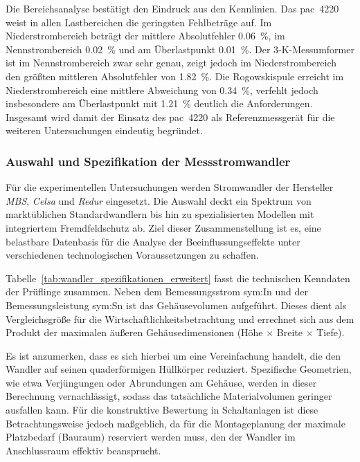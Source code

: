 Die Bereichsanalyse bestätigt den Eindruck aus den Kennlinien. Das \gls{pac}~4220 weist in allen Lastbereichen die geringsten Fehlbeträge auf. Im Niederstrombereich beträgt der mittlere Absolutfehler \SI{0,06}{\percent}, im Nennstrombereich \SI{0,02}{\percent} und am Überlastpunkt \SI{0,01}{\percent}. Der 3-K-Messumformer ist im Nennstrombereich zwar sehr genau, zeigt jedoch im Niederstrombereich den größten mittleren Absolutfehler von \SI{1,82}{\percent}. Die Rogowskispule erreicht im Niederstrombereich eine mittlere Abweichung von \SI{0,34}{\percent}, verfehlt jedoch insbesondere am Überlastpunkt mit \SI{1,21}{\percent} deutlich die Anforderungen. Insgesamt wird damit der Einsatz des \gls{pac}~4220 als Referenzmessgerät für die weiteren Untersuchungen eindeutig begründet.









\subsubsection{Auswahl und Spezifikation der Messstromwandler}
\label{sec:auswahl_wandler}

Für die experimentellen Untersuchungen werden Stromwandler der Hersteller \textit{MBS}, \textit{Celsa} und \textit{Redur} eingesetzt. Die Auswahl deckt ein Spektrum von marktüblichen Standardwandlern bis hin zu spezialisierten Modellen mit integriertem Fremdfeldschutz ab. Ziel dieser Zusammenstellung ist es, eine belastbare Datenbasis für die Analyse der Beeinflussungseffekte unter verschiedenen technologischen Voraussetzungen zu schaffen. 

Tabelle~\ref{tab:wandler_spezifikationen_erweitert} fasst die technischen Kenndaten der Prüflinge zusammen. Neben dem Bemessungsstrom \gls{sym:In} und der Bemessungsleistung \gls{sym:Sn} ist das Gehäusevolumen aufgeführt. Dieses dient als Vergleichsgröße für die Wirtschaftlichkeitsbetrachtung und errechnet sich aus dem Produkt der maximalen äußeren Gehäusedimensionen (Höhe $\times$ Breite $\times$ Tiefe). 



Es ist anzumerken, dass es sich hierbei um eine Vereinfachung handelt, die den Wandler auf seinen quaderförmigen Hüllkörper reduziert. Spezifische Geometrien, wie etwa Verjüngungen oder Abrundungen am Gehäuse, werden in dieser Berechnung vernachlässigt, sodass das tatsächliche Materialvolumen geringer ausfallen kann. Für die konstruktive Bewertung in Schaltanlagen ist diese Betrachtungsweise jedoch maßgeblich, da für die Montageplanung der maximale Platzbedarf (Bauraum) reserviert werden muss, den der Wandler im Anschlussraum effektiv beansprucht.

